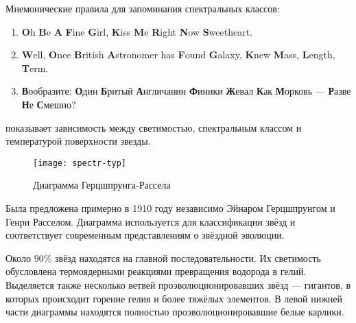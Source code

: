 Мнемонические правила для запоминания спектральных классов:
\begin{enumerate}[1)]
\item\textbf{O}h \textbf{B}e \textbf{A} \textbf{F}ine \textbf{G}irl, \textbf{K}iss \textbf{M}e \textbf{R}ight \textbf{N}ow \textbf{S}weetheart.
\item\textbf{W}ell, \textbf{O}nce \textbf{B}ritish \textbf{A}stronomer has \textbf{F}ound \textbf{G}alaxy, \textbf{K}new \textbf{M}ass, \textbf{L}ength, \textbf{T}erm.
\item \textbf{В}ообразите: \textbf{О}дин \textbf{Б}ритый \textbf{А}нгличанин \textbf{Ф}иники \textbf{Ж}евал \textbf{К}ак \textbf{М}орковь --- \textbf{Р}азве \textbf{Н}е \textbf{С}мешно?
\end{enumerate}

 показывает зависимость между светимостью, спектральным классом и температурой поверхности звезды. 

\begin{figure}[h!]
\centering
\texttt{[image: spectr-typ]}
\caption{Диаграмма Герцшпрунга-Рассела}
\end{figure}

Была предложена примерно в 1910 году независимо Эйнаром Герцшпрунгом и Генри Расселом. Диаграмма используется для классификации звёзд и соответствует современным представлениям о звёздной эволюции.

Около $90 \%$ звёзд находятся на главной последовательности. Их светимость обусловлена термоядерными реакциями превращения водорода в гелий. Выделяется также несколько ветвей проэволюционировавших звёзд --- гигантов, в которых происходит горение гелия и более тяжёлых элементов. В левой нижней части диаграммы находятся полностью проэволюционировавшие белые карлики.

